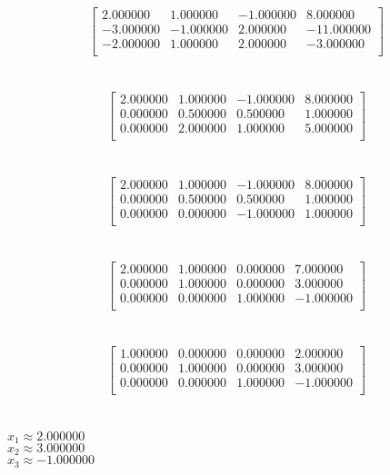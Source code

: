 \documentclass{article}
\begin{document}
\[
\left[
\begin{array}{ccc|c}
	2.000000&1.000000&-1.000000&8.000000\\
	-3.000000&-1.000000&2.000000&-11.000000\\
	-2.000000&1.000000&2.000000&-3.000000\\
\end{array}
\right]
\]
\\
\\
\[
\left[
\begin{array}{ccc|c}
	2.000000&1.000000&-1.000000&8.000000\\
	0.000000&0.500000&0.500000&1.000000\\
	0.000000&2.000000&1.000000&5.000000\\
\end{array}
\right]
\]
\\
\\
\[
\left[
\begin{array}{ccc|c}
	2.000000&1.000000&-1.000000&8.000000\\
	0.000000&0.500000&0.500000&1.000000\\
	0.000000&0.000000&-1.000000&1.000000\\
\end{array}
\right]
\]
\\
\\
\[
\left[
\begin{array}{ccc|c}
	2.000000&1.000000&0.000000&7.000000\\
	0.000000&1.000000&0.000000&3.000000\\
	0.000000&0.000000&1.000000&-1.000000\\
\end{array}
\right]
\]
\\
\\
\[
\left[
\begin{array}{ccc|c}
	1.000000&0.000000&0.000000&2.000000\\
	0.000000&1.000000&0.000000&3.000000\\
	0.000000&0.000000&1.000000&-1.000000\\
\end{array}
\right]
\]
\\
\\
$x_{1} \approx 2.000000$\\
$x_{2} \approx 3.000000$\\
$x_{3} \approx -1.000000$\\
\end{document}
